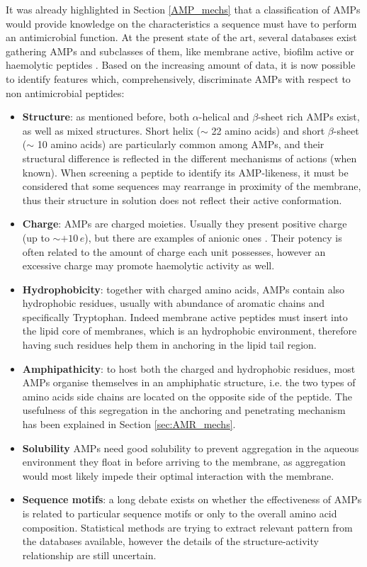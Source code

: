 It was already highlighted in Section \ref{AMP_mechs} that a classification of AMPs would provide knowledge on the characteristics a sequence must have to perform an antimicrobial function.
%
At the present state of the art, several databases exist gathering AMPs and subclasses of them, like membrane active, biofilm active or haemolytic peptides \cite{APD3,DBAASP2,dbAMP,antiBP2,amPEP}. Based on the increasing amount of data, it is now possible to identify features which, comprehensively, discriminate AMPs with respect to non antimicrobial peptides:
%
\begin{itemize}
\item \textbf{Structure}: as mentioned before, both $\alpha$-helical and $\beta$-sheet rich AMPs exist, as well as mixed structures. Short helix ($\sim$ 22 amino acids) \cite{???} and short $\beta$-sheet ($\sim$ 10 amino acids) \cite{???} are particularly common among AMPs, and their structural difference is reflected in the different mechanisms of actions (when known). When screening a peptide to identify its AMP-likeness, it must be considered that some sequences may rearrange in proximity of the membrane, thus their structure in solution does not reflect their active conformation.
\item \textbf{Charge}: AMPs are charged moieties. Usually they present positive charge (up to $\sim + 10\,e$), but there are examples of anionic ones \cite{???see_example_on_AMPR}. Their potency is often related to the amount of charge each unit possesses, however an excessive charge may promote haemolytic activity as well. \cite{???}
\item \textbf{Hydrophobicity}: together with charged amino acids, AMPs contain also hydrophobic residues, usually with abundance of aromatic chains and specifically Tryptophan. Indeed membrane active peptides must insert into the lipid core of membranes, which is an hydrophobic environment, therefore having such residues help them in anchoring in the lipid tail region.
\item \textbf{Amphipathicity}: to host both the charged and hydrophobic residues, most AMPs organise themselves in an amphiphatic structure, i.e. the two types of amino acids side chains are located on the opposite side of the peptide. The usefulness of this segregation in the anchoring and penetrating mechanism has been explained in Section \ref{sec:AMR_mechs}.
\item \textbf{Solubility} AMPs need good solubility to prevent aggregation in the aqueous environment they float in before arriving to the membrane, as aggregation would most likely impede their optimal interaction with the membrane.
\item \textbf{Sequence motifs}: a long debate exists on whether the effectiveness of AMPs is related to particular sequence motifs or only to the overall amino acid composition. Statistical methods are trying to extract relevant pattern from the databases available, however the details of the structure-activity relationship are still uncertain.
\end{itemize}
